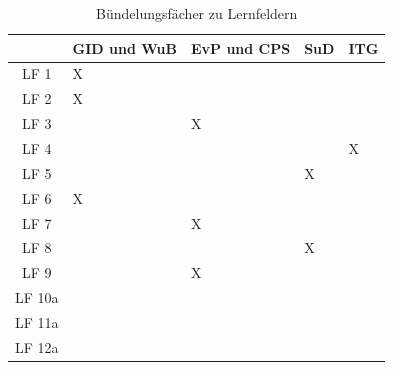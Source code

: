 \begin{table}[H]
    \centering
    \begin{tabularx}{\textwidth}{|c|>{\centering\arraybackslash}X|>{\centering\arraybackslash}X|>{\centering\arraybackslash}X|>{\centering\arraybackslash}X|}
        \hline
               & GID und WuB & EvP und CPS & SuD & ITG \\
        \hline
        LF 1   & X           &             &     &     \\
        \hline
        LF 2   & X           &             &     &     \\
        \hline
        LF 3   &             & X           &     &     \\
        \hline
        LF 4   &             &             &     & X   \\
        \hline
        LF 5   &             &             & X   &     \\
        \hline
        LF 6   & X           &             &     &     \\
        \hline
        LF 7   &             & X           &     &     \\
        \hline
        LF 8   &             &             & X   &     \\
        \hline
        LF 9   &             & X           &     &     \\
        \hline
        LF 10a &             &             &     &     \\
        \hline
        LF 11a &             &             &     &     \\
        \hline
        LF 12a &             &             &     &     \\
        \hline
    \end{tabularx}
    \caption{Bündelungsfächer zu Lernfeldern}
    \label{tab:buendelfaecher}
\end{table}
\FloatBarrier